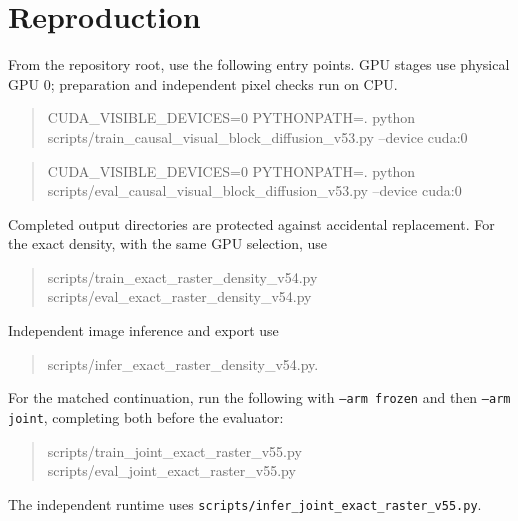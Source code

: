 \documentclass[10pt,a4paper]{article}
\begin{document}

\section*{Reproduction}
From the repository root, use the following entry points. GPU stages use
physical GPU 0; preparation and independent pixel checks run on CPU.
\begin{quote}\small\ttfamily
CUDA\_VISIBLE\_DEVICES=0 PYTHONPATH=. python\\
scripts/train\_causal\_visual\_block\_diffusion\_v53.py --device cuda:0
\end{quote}
\begin{quote}\small\ttfamily
CUDA\_VISIBLE\_DEVICES=0 PYTHONPATH=. python\\
scripts/eval\_causal\_visual\_block\_diffusion\_v53.py --device cuda:0
\end{quote}
Completed output directories are protected against accidental replacement.
For the exact density, with the same GPU selection, use
\begin{quote}\small\ttfamily
scripts/train\_exact\_raster\_density\_v54.py\\
scripts/eval\_exact\_raster\_density\_v54.py
\end{quote}
Independent image inference and export use
\begin{quote}\small\ttfamily
scripts/infer\_exact\_raster\_density\_v54.py.
\end{quote}
For the matched continuation, run the following with \texttt{--arm frozen}
and then \texttt{--arm joint}, completing both before the evaluator:
\begin{quote}\small\ttfamily
scripts/train\_joint\_exact\_raster\_v55.py\\
scripts/eval\_joint\_exact\_raster\_v55.py
\end{quote}
The independent runtime uses
\texttt{scripts/infer\_joint\_exact\_raster\_v55.py}.
\end{document}
